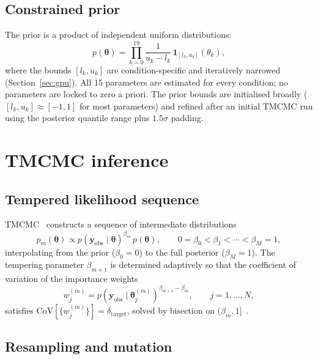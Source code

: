 \documentclass[11pt,a4paper]{article}
\newcommand{\btheta}{\boldsymbol{\theta}}
\newcommand{\yobs}{\mathbf{y}_{\mathrm{obs}}}
\begin{document}
\subsection{Constrained prior}

The prior is a product of independent uniform distributions:
\begin{equation}
p(\btheta) = \prod_{k=0}^{19} \frac{1}{u_k-l_k}\,\mathbf{1}_{[l_k,u_k]}(\theta_k),
\label{eq:prior}
\end{equation}
where the bounds $[l_k,u_k]$ are condition-specific and iteratively narrowed (Section~\ref{sec:gpu}).
All 15 parameters are estimated for every condition; no parameters are locked to zero a priori.
The prior bounds are initialised broadly ($[l_k,u_k]\approx[-1,1]$ for most parameters) and refined after an initial TMCMC run using the posterior quantile range plus $1.5\sigma$ padding.

\section{TMCMC inference}
\label{sec:tmcmc}

\subsection{Tempered likelihood sequence}

TMCMC~\cite{ChingChen2007TMCMC, DelMoral2006SMC, Chopin2002SMC} constructs a sequence of intermediate distributions
\begin{equation}
p_m(\btheta) \propto p(\yobs\mid\btheta)^{\beta_m}\,p(\btheta),
\qquad
0=\beta_0<\beta_1<\cdots<\beta_M=1,
\label{eq:tempered}
\end{equation}
interpolating from the prior ($\beta_0=0$) to the full posterior ($\beta_M=1$).
The tempering parameter $\beta_{m+1}$ is determined adaptively so that the coefficient of variation of the importance weights
\begin{equation}
w_j^{(m)} = p(\yobs\mid\btheta_j^{(m)})^{\beta_{m+1}-\beta_m},
\qquad j=1,\dots,N,
\label{eq:weights}
\end{equation}
satisfies $\mathrm{CoV}[\{w_j^{(m)}\}]=\delta_{\mathrm{target}}$, solved by bisection on $(\beta_m,1]$~\cite{Betz2016TMCMC}.

\subsection{Resampling and mutation}
\end{document}
